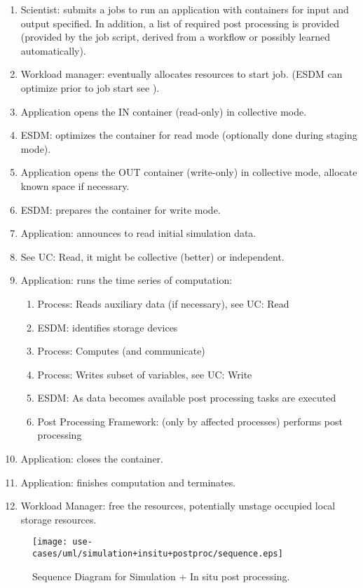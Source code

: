 \begin{enumerate}
	\item Scientist: submits a jobs to run an application with containers for input and output specified. In addition, a list of required post processing is provided (provided by the job script, derived from a workflow or possibly learned automatically).
	\item Workload manager: eventually allocates resources to start job. (ESDM can optimize prior to job start see ).
	\item Application opens the IN container (read-only) in collective mode.
	\item ESDM: optimizes the container for read mode (optionally done during staging mode).
	\item Application opens the OUT container (write-only) in collective mode, allocate known space if necessary.
	\item ESDM: prepares the container for write mode.
	\item Application: announces to read initial simulation data.
	\item See UC: Read, it might be collective (better) or independent.
	\item Application: runs the time series of computation:
	\begin{enumerate}
		\item Process: Reads auxiliary data (if necessary), see UC: Read
		\item ESDM: identifies storage devices
		\item Process: Computes (and communicate)
		\item Process: Writes subset of variables, see UC: Write
		\item ESDM: As data becomes available post processing tasks are executed
		\item Post Processing Framework: (only by affected processes) performs post processing
	\end{enumerate}
	\item Application: closes the container.
	\item Application: finishes computation and terminates.
	\item Workload Manager: free the resources, potentially unstage occupied local storage resources.
\end{enumerate}


\begin{figure}
	\centering
	\texttt{[image: use-cases/uml/simulation+insitu+postproc/sequence.eps]}
	\caption{Sequence Diagram for Simulation + In situ post processing.}
	\label{fig:sequence in-situ}
\end{figure}




